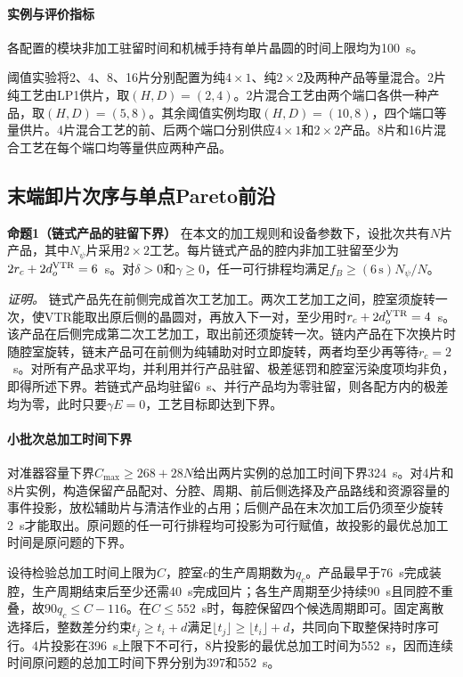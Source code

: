 \documentclass[final,5p,times,twocolumn]{elsarticle}
\begin{document}
\paragraph{实例与评价指标}
各配置的模块非加工驻留时间和机械手持有单片晶圆的时间上限均为100~s。

阈值实验将2、4、8、16片分别配置为纯$4\times1$、纯$2\times2$及两种产品等量混合。2片纯工艺由LP1供片，取$(H,D)=(2,4)$。2片混合工艺由两个端口各供一种产品，取$(H,D)=(5,8)$。其余阈值实例均取$(H,D)=(10,8)$，四个端口等量供片。4片混合工艺的前、后两个端口分别供应$4\times1$和$2\times2$产品。8片和16片混合工艺在每个端口均等量供应两种产品。

\subsection{末端卸片次序与单点Pareto前沿}
\label{sec:structural-front-cn}

\noindent\textbf{命题1（链式产品的驻留下界）}\quad
在本文的加工规则和设备参数下，设批次共有$N$片产品，其中$N_\psi$片采用$2\times2$工艺。每片链式产品的腔内非加工驻留至少为$2r_c+2d_o^{\rm VTR}=6$~s。对$\delta>0$和$\gamma\ge0$，任一可行排程均满足$f_B\ge(6\,\mathrm{s})N_\psi/N$。

\noindent\textit{证明。}
链式产品先在前侧完成首次工艺加工。两次工艺加工之间，腔室须旋转一次，使VTR能取出原后侧的晶圆对，再放入下一对，至少用时$r_c+2d_o^{\rm VTR}=4$~s。该产品在后侧完成第二次工艺加工，取出前还须旋转一次。链内产品在下次换片时随腔室旋转，链末产品可在前侧为纯辅助对时立即旋转，两者均至少再等待$r_c=2$~s。对所有产品求平均，并利用并行产品驻留、极差惩罚和腔室污染度项均非负，即得所述下界。若链式产品均驻留6~s、并行产品均为零驻留，则各配方内的极差均为零，此时只要$\gamma E=0$，工艺目标即达到下界。

\paragraph{小批次总加工时间下界}
对准器容量下界$C_{\max}\ge268+28N$给出两片实例的总加工时间下界324~s。对4片和8片实例，构造保留产品配对、分腔、周期、前后侧选择及产品路线和资源容量的事件投影，放松辅助片与清洁作业的占用；后侧产品在末次加工后仍须至少旋转2~s才能取出。原问题的任一可行排程均可投影为可行赋值，故投影的最优总加工时间是原问题的下界。

设待检验总加工时间上限为$C$，腔室$c$的生产周期数为$q_c$。产品最早于76~s完成装腔，生产周期结束后至少还需40~s完成回片；各生产周期至少持续90~s且同腔不重叠，故$90q_c\le C-116$。在$C\le552$~s时，每腔保留四个候选周期即可。固定离散选择后，整数差分约束$t_j\ge t_i+d$满足$\lfloor t_j\rfloor\ge\lfloor t_i\rfloor+d$，共同向下取整保持时序可行。4片投影在396~s上限下不可行，8片投影的最优总加工时间为552~s，因而连续时间原问题的总加工时间下界分别为397和552~s。
\end{document}
